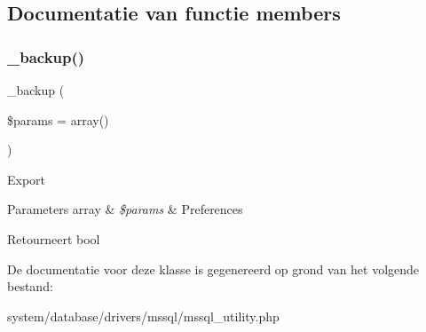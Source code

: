 \subsection{Documentatie van functie members}
\mbox{\label{class_c_i___d_b__mssql__utility_a30f3053d2c82e7562349924363507afa}} 
\subsubsection{\texorpdfstring{\_backup()}{\_backup()}}
{\footnotesize\ttfamily \+\_\+backup (\begin{DoxyParamCaption}\item[{}]{\$params = {\ttfamily array()} }\end{DoxyParamCaption})\hspace{0.3cm}{\ttfamily [protected]}}

Export


\begin{DoxyParams}[1]{Parameters}
array & {\em \$params} & Preferences \\
\hline
\end{DoxyParams}
\begin{DoxyReturn}{Retourneert}
bool 
\end{DoxyReturn}


De documentatie voor deze klasse is gegenereerd op grond van het volgende bestand\+:\begin{DoxyCompactItemize}
\item 
system/database/drivers/mssql/mssql\+\_\+utility.\+php\end{DoxyCompactItemize}
